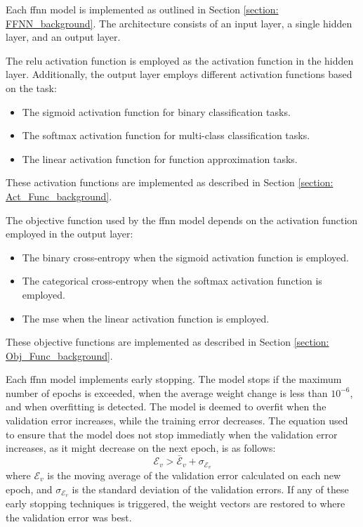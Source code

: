 \documentclass[10pt, conference]{IEEEtran}
\begin{document}
Each \acrshort{ffnn} model is implemented as outlined in Section \ref{section: FFNN_background}. The architecture
consists of an input layer, a single hidden layer, and an output layer.

The \acrshort{relu} activation function is employed as the activation function in the hidden layer. Additionally,
the output layer employs different activation functions based on the task:
\begin{itemize}
    \item The sigmoid activation function for binary classification tasks.
    \item The softmax activation function for multi-class classification tasks.
    \item The linear activation function for function approximation tasks.
\end{itemize}
These activation functions are implemented as described in Section \ref{section: Act_Func_background}.

The objective function used by the \acrshort{ffnn} model depends on the activation function employed in the
output layer:
\begin{itemize}
    \item The binary cross-entropy when the sigmoid activation function is employed.
    \item The categorical cross-entropy when the softmax activation function is employed.
    \item The \acrshort{mse} when the linear activation function is employed.
\end{itemize}
These objective functions are implemented as described in Section \ref{section: Obj_Func_background}.

Each \acrshort{ffnn} model implements early stopping. The model stops if the maximum number of epochs is
exceeded, when the average weight change is less than $10^{-6}$, and when overfitting is detected. The model
is deemed to overfit when the validation error increases, while the training error decreases. The equation used
to ensure that the model does not stop immediatly when the validation error increases, as it might decrease on
the next epoch, is as follows:
\begin{equation}
    \mathcal{E}_v > \bar{\mathcal{E}}_v + \sigma_{\mathcal{E}_v} \label{eq: early_stopping}
\end{equation}
where $\mathcal{E}_v$ is the moving average of the validation error calculated on each new epoch, and
$\sigma_{\mathcal{E}_v}$ is the standard deviation of the validation errors. If any of these early
stopping techniques is triggered, the weight vectors are restored to where the validation error
was best.
\end{document}
